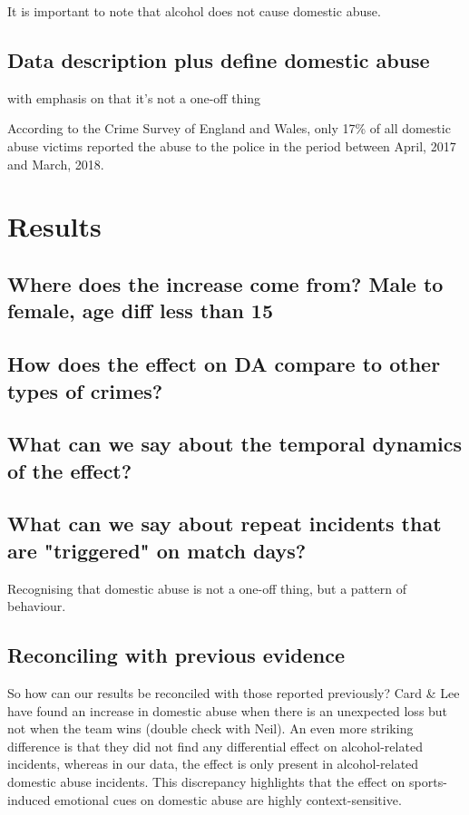 \documentclass[12pt, letterpaper]{article}
\begin{document}
It is important to note that alcohol does not cause domestic abuse.


\subsection{Data description plus define domestic abuse}

with emphasis on that it's not a one-off thing 

According to the Crime Survey of England and Wales, only 17\% of all domestic abuse victims reported the abuse to the police in the period between April, 2017 and March, 2018.

\section{Results}

\subsection{Where does the increase come from? Male to female, age diff less than 15}

\subsection{How does the effect on DA compare to other types of crimes?}

\subsection{What can we say about the temporal dynamics of the effect?}


\subsection{What can we say about repeat incidents that are "triggered" on match days?}

Recognising that domestic abuse is not a one-off thing, but a pattern of behaviour.



\subsection{Reconciling with previous evidence}

So how can our results be reconciled with those reported previously? Card \& Lee have found an increase in domestic abuse when there is an unexpected loss but not when the team wins (double check with Neil). An even more striking difference is that they did not find any differential effect on alcohol-related incidents, whereas in our data, the effect is only present in alcohol-related domestic abuse incidents. This discrepancy highlights that the effect on sports-induced emotional cues on domestic abuse are highly context-sensitive.
\end{document}
